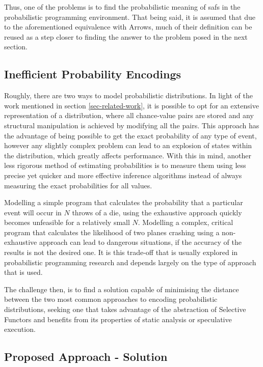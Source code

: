 \documentclass[
  oneside,
  11pt, a4paper,
  footinclude=true,
  headinclude=true,
  cleardoublepage=empty
]{scrbook}
\theoremstyle{definition}
\theoremstyle{definition}
\begin{document}
	Thus, one of the problems is to find the probabilistic meaning of \glspl{saf} in the probabilistic programming environment. That being said, it is assumed that due to the aforementioned equivalence with Arrows, much of their definition can be reused as a step closer to finding the answer to the problem posed in the next section.

	\subsection{Inefficient Probability Encodings}

	Roughly, there are two ways to model probabilistic distributions. In light of the work mentioned in section \ref{sec-related-work}, it is possible to opt for an extensive representation of a distribution, where all chance-value pairs are stored and any structural manipulation is achieved by modifying all the pairs. This approach has the advantage of being possible to get the exact probability of any type of event, however any slightly complex problem can lead to an explosion of states within the distribution, which greatly affects performance. With this in mind, another less rigorous method of estimating probabilities is to measure them using less precise yet quicker and more effective inference algorithms instead of always measuring the exact probabilities for all values. 

    Modelling a simple program that calculates the probability that a particular event will occur in $N$ throws of a die, using the exhaustive approach quickly becomes unfeasible for a relatively small $N$. Modelling a complex, critical program that calculates the likelihood of two planes crashing using a non-exhaustive approach can lead to dangerous situations, if the accuracy of the results is not the desired one. It is this trade-off that is usually explored in probabilistic programming research and depends largely on the type of approach that is used.

    The challenge then, is to find a solution capable of minimising the distance between the two most common approaches to encoding probabilistic distributions, seeking one that takes advantage of the abstraction of Selective Functors and benefits from its properties of static analysis or speculative execution.
	
	\subsection{Proposed Approach - Solution}\label{sec-approach}
\end{document}
